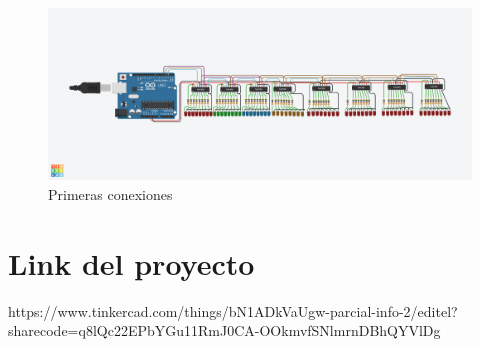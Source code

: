 \documentclass{article}
\begin{document}
\begin{figure}[h]
\includegraphics[width=15cm]{PARCIAL INFO 2.png}
\centering
\caption{Primeras conexiones}
\label{fig:PARCIAL INFO 2}
\end{figure}

\section{Link del proyecto}\label{link}

https://www.tinkercad.com/things/bN1ADkVaUgw-parcial-info-2/editel?sharecode=q8lQc22EPbYGu11RmJ0CA-OOkmvfSNlmrnDBhQYVlDg
\end{document}
